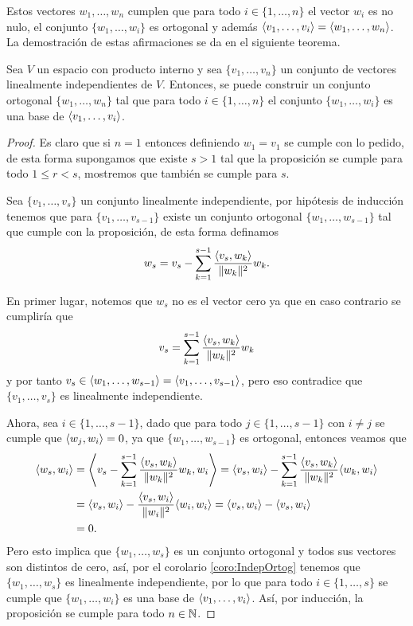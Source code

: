 Estos vectores $w_1,\ldots,w_n$ cumplen que para todo $i \in \{1,\ldots,n\}$ el vector $w_i$ es no nulo, el conjunto $\{w_1,\ldots,w_i\}$ es ortogonal y además $\langle v_1,\ldots,v_i\rangle = \langle w_1,\ldots,w_n\rangle$. La demostración de estas afirmaciones se da en el siguiente teorema.

\begin{teor}
  Sea $V$ un espacio con producto interno y sea $\{v_1,\ldots,v_n\}$ un conjunto de vectores linealmente independientes de $V$. Entonces, se puede construir un conjunto ortogonal $\{w_1,\ldots,w_n\}$ tal que para todo $i \in \{1,\ldots,n\}$ el conjunto $\{w_1,\ldots,w_i\}$ es una base de $\langle v_1,\ldots,v_i\rangle$.
\end{teor}
\begin{proof}
  Es claro que si $n=1$ entonces definiendo $w_1 = v_1$ se cumple con lo pedido, de esta forma supongamos que existe $s>1$ tal que la proposición se cumple para todo $1 \leq r < s$, mostremos que también se cumple para $s$.

  Sea $\{v_1,\ldots,v_s\}$ un conjunto linealmente independiente,  por hipótesis de inducción tenemos que para $\{v_1,\ldots,v_{s-1}\}$ existe un conjunto ortogonal $\{w_1,\ldots,w_{s-1}\}$ tal que cumple con la proposición, de esta forma definamos
    \[
      w_s = v_s - \sum_{k=1}^{s-1} \frac{\langle v_s,w_k\rangle}{\mathopen\|w_k\mathclose\|^2} w_k.
    \]
  
  En primer lugar, notemos que $w_s$ no es el vector cero ya que en caso contrario se cumpliría que
    \[
      v_s = \sum_{k=1}^{s-1} \frac{\langle v_s,w_k\rangle}{\mathopen\|w_k\mathclose\|^2} w_k
    \]
  y por tanto $v_s \in \langle w_1,\ldots,w_{s-1}\rangle=\langle v_1,\ldots,v_{s-1}\rangle$, pero eso contradice que $\{v_1,\ldots,v_s\}$ es linealmente independiente.

  Ahora, sea $i \in \{1,\ldots,s-1\}$, dado que para todo $j \in  \{1,\ldots,s-1\}$ con $i \neq j$ se cumple que $\langle w_j,w_i\rangle = 0$, ya que $\{w_1,\ldots,w_{s-1}\}$ es ortogonal, entonces veamos que
    \begin{align*}
      \inner{w_s, w_i}
        &= \Inner{v_s - \sum_{k=1}^{s-1} \frac{\inner{v_s,w_k}}{\norm{w_k}^2} w_k, w_i} 
        = \inner{v_s,w_i} - \sum_{k=1}^{s-1} \frac{\inner{v_s,w_k}}{\norm{w_k}^2} \inner{w_k, w_i} \\
        &= \inner{v_s,w_i} - \frac{\inner{v_s,w_i}}{\norm{w_i}^2} \inner{w_i, w_i} 
        = \inner{v_s,w_i} - \inner{v_s,w_i} \\
        &= 0.
    \end{align*}
  Pero esto implica que $\{w_1,\ldots,w_s\}$ es un conjunto ortogonal y todos sus vectores son distintos de cero, así, por el corolario \ref{coro:IndepOrtog} tenemos que $\{w_1,\ldots,w_s\}$ es linealmente independiente, por lo que para todo $i \in \{1,\ldots,s\}$ se cumple que $\{w_1,\ldots,w_i\}$ es una base de $\langle v_1,\ldots,v_i\rangle$. Así, por inducción, la proposición se cumple para todo $n \in \mathbb{N}$.
\end{proof}

